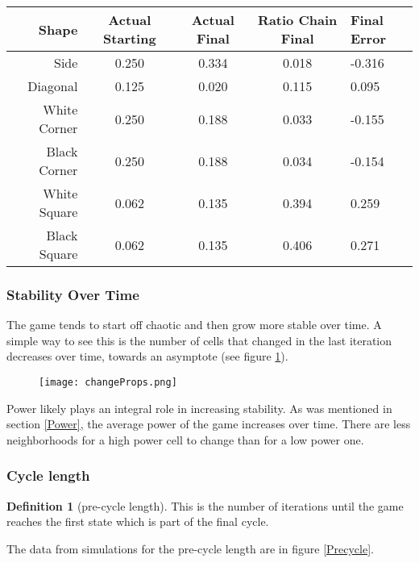 \documentclass[12pt]{article}
\theoremstyle{definition}
\newtheorem{definition}{Definition}%
\theoremstyle{remark}
\theoremstyle{remark}
\begin{document}
\begin{table}[H]
\begin{tabular}{r|c c c | l}
  Shape & Actual Starting & Actual Final & Ratio Chain Final & Final Error \\ \hline
  Side         & 0.250 & 0.334 & 0.018 & -0.316 \\
  Diagonal     & 0.125 & 0.020 & 0.115 & 0.095 \\
  White Corner & 0.250 & 0.188 & 0.033 & -0.155 \\
  Black Corner & 0.250 & 0.188 & 0.034 & -0.154 \\
  White Square & 0.062 & 0.135 & 0.394 & 0.259 \\
  Black Square & 0.062 & 0.135 & 0.406 & 0.271 \\
\end{tabular}
\caption{}
\end{table}


\subsubsection{Stability Over Time}
The game tends to start off chaotic and then grow more stable over time. A simple way to see this is the number of cells that changed in the last iteration decreases over time, towards an asymptote (see figure \ref{ChangeOverTime}). 

\begin{figure}
  \centering
  \texttt{[image: changeProps.png]}
  \caption{}
  \label{ChangeOverTime}
\end{figure}

\par
Power likely plays an integral role in increasing stability. As was mentioned in section \ref{Power}, the average power of the game increases over time. There are less neighborhoods for a high power cell to change than for a low power one. 

\subsubsection{Cycle length}

\begin{definition}[pre-cycle length]
This is the number of iterations until the game reaches the first state which is part of the final cycle.
\end{definition}
\par
The data from simulations for the pre-cycle length are in figure \ref{Precycle}. 
\end{document}
